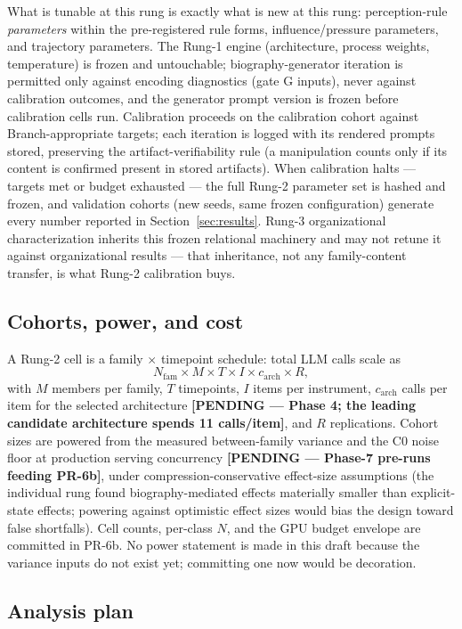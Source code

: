 \documentclass[12pt, letterpaper]{article}
\newcommand{\pending}[1]{\textcolor{blue!55!black}{\textbf{[PENDING --- #1]}}}
\begin{document}
What is tunable at this rung is exactly what is new at this rung: perception-rule \emph{parameters} within the pre-registered rule forms, influence/pressure parameters, and trajectory parameters. The Rung-1 engine (architecture, process weights, temperature) is frozen and untouchable; biography-generator iteration is permitted only against encoding diagnostics (gate G inputs), never against calibration outcomes, and the generator prompt version is frozen before calibration cells run. Calibration proceeds on the calibration cohort against Branch-appropriate targets; each iteration is logged with its rendered prompts stored, preserving the artifact-verifiability rule (a manipulation counts only if its content is confirmed present in stored artifacts). When calibration halts --- targets met or budget exhausted --- the full Rung-2 parameter set is hashed and frozen, and validation cohorts (new seeds, same frozen configuration) generate every number reported in Section~\ref{sec:results}. Rung-3 organizational characterization inherits this frozen relational machinery and may not retune it against organizational results --- that inheritance, not any family-content transfer, is what Rung-2 calibration buys.

\subsection{Cohorts, power, and cost}
\label{sec:power}

A Rung-2 cell is a family $\times$ timepoint schedule: total LLM calls scale as
\[
N_{\text{fam}} \times M \times T \times I \times c_{\text{arch}} \times R,
\]
with $M$ members per family, $T$ timepoints, $I$ items per instrument, $c_{\text{arch}}$ calls per item for the selected architecture \pending{Phase 4; the leading candidate architecture spends 11 calls/item}, and $R$ replications. Cohort sizes are powered from the measured between-family variance and the C0 noise floor at production serving concurrency \pending{Phase-7 pre-runs feeding PR-6b}, under compression-conservative effect-size assumptions (the individual rung found biography-mediated effects materially smaller than explicit-state effects; powering against optimistic effect sizes would bias the design toward false shortfalls). Cell counts, per-class $N$, and the GPU budget envelope are committed in PR-6b. No power statement is made in this draft because the variance inputs do not exist yet; committing one now would be decoration.

\subsection{Analysis plan}
\label{sec:analysis}
\end{document}

